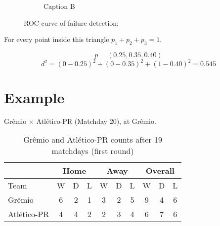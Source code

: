 \documentclass[journal,article,accept,moreauthors,pdftex,12pt,a4paper]{mdpi}
\begin{document}
\begin{figure}[!ht]
\begin{subfigure}[b]{0.48\linewidth}


        \caption{Caption B}
        \label{fig:B}
    \end{subfigure}
    \caption{ROC curve of failure detection;}
    \label{fig:roc_curve}
\end{figure}



For every point inside this triangle $p_1+p_2+p_3=1$.



\[p=(0.25,0.35,0.40)\]
\[d^2=(0-0.25)^2+(0-0.35)^2+(1-0.40)^2=0.545\]


\section{Example}

Gr\^emio $\times$ Atl\'etico-PR (Matchday 20), at Gr\^emio.

\begin{table}[h]
\begin{center}
\begin{tabular}{lccccccccc}

\hline
 & \multicolumn{3}{c}{Home} & \multicolumn{3}{c}{Away}& \multicolumn{3}{c}{Overall} \\
\hline
\hline
Team & W & D & L & W & D & L & W & D & L\\
\hline
Gr\^emio & 6 & 2 & 1 & 3 & 2 & 5 & 9 & 4 & 6\\
Atl\'etico-PR & 4 & 4 & 2 & 2 & 3 & 4 & 6 & 7 & 6\\
\hline
\end{tabular}
\caption{Gr\^emio and Atl\'etico-PR counts after 19 matchdays (first round)}
\end{center}
\end{table}
\end{document}
